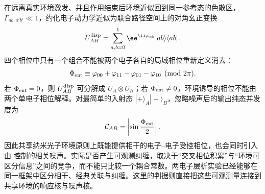 在远离真实环境激发、并且作用结束后环境近似回到同一参考态的色散区，$\Gamma_{ab,a'b'}\ll1$，约化电子动力学近似为联合路径空间上的对角幺正变换
\[
U_{AB}^{\rm disp}
=\sum_{a,b=0}^{1}
\ee^{\ii\varphi_{ab}}|ab\rangle\langle ab|.
\]
四个相位中只有一个组合不能被两个电子各自的局域相位重新定义消去：
\begin{equation}
{
\Phi_{\rm ent}
\equiv
\varphi_{00}+\varphi_{11}-\varphi_{01}-\varphi_{10}
\pmod{2\pi}.}
\label{eq:two_electron_entangling_phase_invariant}
\end{equation}
若 $\Phi_{\rm ent}=0$，则 $U_{AB}^{\rm disp}$ 可分解成 $U_A\otimes U_B$；若
$\Phi_{\rm ent}\neq0$，环境诱导的相位不能由两个单电子相位解释。对最简单的入射态
$|+\rangle_A|+\rangle_B$，忽略噪声后的输出纯态并发度为
\begin{equation}
{
\mathcal C_{AB}
=\left|\sin\frac{\Phi_{\rm ent}}2\right|.}
\label{eq:two_electron_controlled_phase_concurrence}
\end{equation}
因此共享纳米光子环境原则上既能提供相干的电子--电子受控相位，也会同时引入由 控制的相关噪声。实际是否产生可观测纠缠，取决于“交叉相位积累”与“环境可区分信息”之间的竞争，而不能只比较一个耦合常数。两电子层析实验已经能够在同一框架中区分相干、经典关联与纠缠\cite{Tziperman2026TwoElectron}。这里的判据则直接把这些可观测量连接到共享环境的响应核与噪声核。

